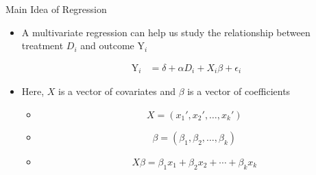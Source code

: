 \documentclass[dvipsnames,hyperref={pdfpagelabels=false}]{beamer}
\begin{document}
\begin{frame}{Main Idea of Regression}
	\begin{itemize}

		\item A multivariate regression can help us study the relationship between treatment $D_i$ and outcome $\mathrm{Y}_i$
		
		
		\begin{equation*}
		\begin{aligned}
		\mathrm{Y}_i &= \delta + \alpha D_i + X_{i} \beta + \epsilon_{i}
		\end{aligned}
		\end{equation*}	
		
		
		\item Here, $X$ is a vector of covariates and  $\beta$ is a vector of coefficients
					\vspace{0.2cm} 
			\begin{itemize}
		\item[] \[ X = (x_1', x_2', \ldots, x_k') \]
	\item[]	\[ \beta = (\beta_1, \beta_2, \ldots, \beta_k) \]
	
	\item[] \[ X \beta = \beta_1 x_1 + \beta_2 x_2 + \cdots + \beta_k x_k \]
				
			\end{itemize}
		

		
		
	\end{itemize}
\end{frame}
\end{document}

